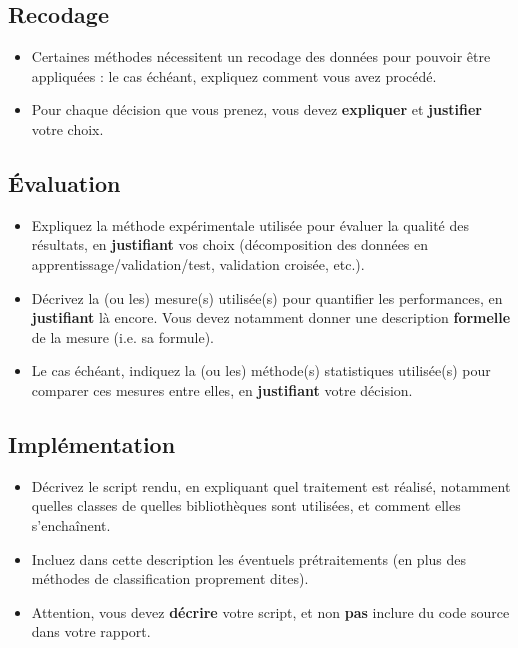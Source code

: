 \documentclass{ceri/sty/rapport}
\begin{document}
\subsection{Recodage}
\begin{itemize}
	\item Certaines méthodes nécessitent un recodage des données pour pouvoir être appliquées : le cas échéant, expliquez comment vous avez procédé.
	\item Pour chaque décision que vous prenez, vous devez \textbf{expliquer} et \textbf{justifier} votre choix.
\end{itemize}




\subsection{Évaluation}
\begin{itemize}
	\item Expliquez la méthode expérimentale utilisée pour évaluer la qualité des résultats, en \textbf{justifiant} vos choix (décomposition des données en apprentissage/validation/test, validation croisée, etc.).
	\item Décrivez la (ou les) mesure(s) utilisée(s) pour quantifier les performances, en \textbf{justifiant} là encore. Vous devez notamment donner une description \textbf{formelle} de la mesure (i.e. sa formule).
	\item Le cas échéant, indiquez la (ou les) méthode(s) statistiques utilisée(s) pour comparer ces mesures entre elles, en \textbf{justifiant} votre décision.
\end{itemize}





\subsection{Implémentation}
\begin{itemize}
	\item Décrivez le script rendu, en expliquant quel traitement est réalisé, notamment quelles classes de quelles bibliothèques sont utilisées, et comment elles s'enchaînent.
    \item Incluez dans cette description les éventuels prétraitements (en plus des méthodes de classification proprement dites).
	\item Attention, vous devez \textbf{décrire} votre script, et non \textbf{pas} inclure du code source dans votre rapport.
\end{itemize}
\end{document}
